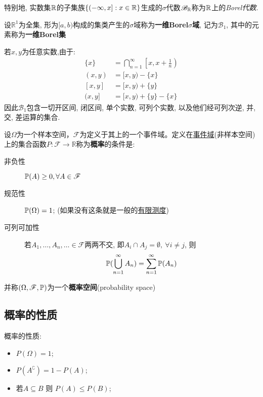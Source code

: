 特别地, 实数集$\R$的子集族$\{(-\infty,x] : x\in\R\}$生成的$\sigma$代数$\mathscr{B}_{\R}$称为$\R$上的\emph{Borel代数}.

\begin{definition}[Borel集]
    设$\mathbb{R}^1$为全集, 形为$[a,b)$构成的集类产生的$\sigma$域称为\textbf{一维Borel$\sigma$域}, 记为$\mathscr{B}_1$, 其中的元素称为\textbf{一维Borel集}
\end{definition}

若$x,y$为任意实数,由于:
\begin{align*}
    \{x\}  & =  \bigcap_{n=1}^{\infty}\left[x, x+\frac{1}{n}\right) \\
    (x, y) & =  [x, y)-\{x\}                                        \\
    [x, y] & =  [x, y)+\{y\}                                        \\
    (x, y] & =  [x, y)+\{y\}-\{x\}
\end{align*}
因此$\mathscr{B}_1$包含一切开区间, 闭区间, 单个实数, 可列个实数, 以及他们经可列次逆, 并, 交, 差运算的集合.

\begin{definition}[概率空间]
    设$\Omega$为一个样本空间，$\mathscr{F}$为定义于其上的一个事件域。定义在\underline{事件域}(非样本空间)上的集合函数$P : \mathscr{F} \to \mathbb{R}$称为\textbf{概率}的条件是:
    \begin{description}
        \item[非负性] $\P(A)\ge 0 , \forall A \in \mathscr{F}$
        \item[规范性] $\P(\Omega) = 1$; (如果没有这条就是一般的\underline{有限测度})
        \item[可列可加性] 若$A_{1},\dots,A_{n},\ldots \in \mathscr{F}$两两不交, 即$A_{i}\cap A_{j} = \emptyset, \ \forall i\neq j$, 则
            \[ \P(\bigcup_{n=1}^{\infty}A_{n}) = \sum_{n=1}^{\infty}\P(A_{n}) \]
    \end{description}
    并称$(\Omega,\mathscr{F},\P)$为一个\textbf{概率空间}(probability space)
\end{definition}

\subsection{概率的性质}

\begin{property}
    概率的性质:
    \begin{itemize}
        \item $P(\Omega)=1$;
        \item $P(A^{\complement})=1-P(A)$;
        \item 若$A \subseteq B $ 则 $P(A)\le P(B)$;
    \end{itemize}
\end{property}

